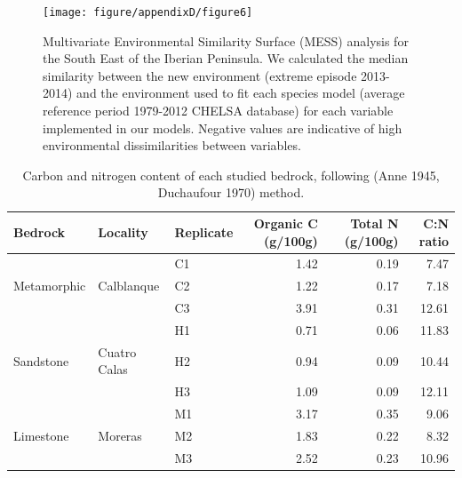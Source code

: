 \documentclass[11pt,twoside]{reedthesis}
\begin{document}
\begin{figure}[hbt!]

{\centering \texttt{[image: figure/appendixD/figure6]} 

}

\caption[Multivariate Environmental Similarity Surface (MESS) analysis for the South East of the Iberian Peninsula.]{Multivariate Environmental Similarity Surface (MESS) analysis for the South East of the Iberian Peninsula. We calculated the median similarity between the new environment (extreme episode 2013-2014) and the environment used to fit each species model (average reference period 1979-2012 CHELSA database) for each variable implemented in our models. Negative values are indicative of high environmental dissimilarities between variables.}\label{fig:unnamed-chunk-22}
\end{figure}
\newpage
\begin{table}[H]

\caption[Carbon and nitrogen content of each studied bedrock, following (Anne 1945, Duchaufour 1970) method.]{\label{tab:unnamed-chunk-23}Carbon and nitrogen content of each studied bedrock, following (Anne 1945, Duchaufour 1970) method.}
\centering
\fontsize{8}{10}\selectfont
\begin{tabular}[t]{lllrrr}
\toprule
Bedrock & Locality & Replicate & Organic C (g/100g) & Total N (g/100g) & C:N ratio\\
\midrule
 &  & C1 & 1.42 & 0.19 & 7.47\\
Metamorphic & Calblanque & C2 & 1.22 & 0.17 & 7.18\\
 &  & C3 & 3.91 & 0.31 & 12.61\\
 &  & H1 & 0.71 & 0.06 & 11.83\\
Sandstone & Cuatro Calas & H2 & 0.94 & 0.09 & 10.44\\
 &  & H3 & 1.09 & 0.09 & 12.11\\
 &  & M1 & 3.17 & 0.35 & 9.06\\
Limestone & Moreras & M2 & 1.83 & 0.22 & 8.32\\
 &  & M3 & 2.52 & 0.23 & 10.96\\
\bottomrule
\end{tabular}
\end{table}
\newpage
\end{document}
